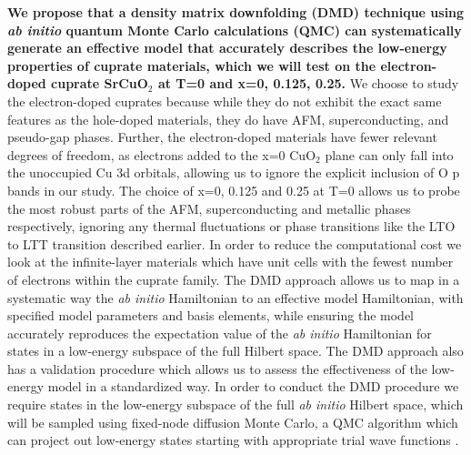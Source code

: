 \documentclass{article}
\begin{document}
\textbf{We propose that a density matrix downfolding (DMD) \cite{10.3389/fphy.2018.00043, doi:10.1063/1.4927664} technique using \textit{ab initio} quantum Monte Carlo calculations (QMC) can systematically generate an effective model that accurately describes the low-energy properties of cuprate materials, which we will test on the electron-doped cuprate SrCuO$_2$ at T=0 and x=0, 0.125, 0.25. }
We choose to study the electron-doped cuprates because while they do not exhibit the exact same features as the hole-doped materials, they do have AFM,  superconducting, and pseudo-gap phases.
Further, the electron-doped materials have fewer relevant degrees of freedom, as electrons added to the x=0 CuO$_2$ plane can only fall into the unoccupied Cu 3d orbitals, allowing us to ignore the explicit inclusion of O p bands in our study. 
The choice of x=0, 0.125 and 0.25 at T=0 allows us to probe the most robust parts of the AFM, superconducting and metallic phases respectively, ignoring any thermal fluctuations or phase transitions like the LTO to LTT transition described earlier. 
In order to reduce the computational cost we look at the infinite-layer materials which have unit cells with the fewest number of electrons within the cuprate family.
The DMD approach allows us to map in a systematic way the \textit{ab initio} Hamiltonian to an effective model Hamiltonian, with specified model parameters and basis elements, while ensuring the model accurately reproduces the expectation value of the \textit{ab initio} Hamiltonian for states in a low-energy subspace of the full Hilbert space. 
The DMD approach also has a validation procedure which allows us to assess the effectiveness of the low-energy model in a standardized way.
In order to conduct the DMD procedure we require states in the low-energy subspace of the full \textit{ab initio} Hilbert space, which will be sampled using fixed-node diffusion Monte Carlo, a QMC algorithm which can project out low-energy states starting with appropriate trial wave functions \cite{RevModPhys.73.33}.
 
\end{document}
